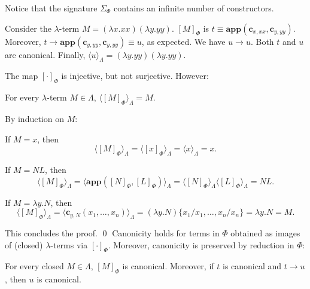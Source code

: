 \documentclass{LMCS}
\newcommand{\varone}{x}
\newcommand{\vartwo}{y}
\newcommand{\lambdaone}{M}
\newcommand{\lambdatwo}{N}
\newcommand{\lambdathree}{L}
\newcommand{\termone}{t}
\newcommand{\termtwo}{u}
\newcommand{\appTRS}{\mathbf{app}}
\newcommand{\constr}[2]{\mathbf{c}_{#1,#2}}
\newcommand{\LambdatoTRS}[1]{[#1]_{\Phi}}
\newcommand{\TRStolambda}[1]{\langle{#1}\rangle_{\Lambdaterms}}
\newcommand{\Lambdaterms}{\Lambda}
\newcommand{\Functions}[1]{\Sigma_{#1}}
\newcommand{\TRS}{\Phi}
\newcommand{\rewrTRS}{\rightarrow}
\newenvironment{varitemize}
{
\begin{list}{\labelitemi}
{\setlength{\itemsep}{0.0mm}
 \setlength{\topsep}{0.0mm}
 \setlength{\parindent}{0.0mm}
 \setlength{\parskip}{0.0mm}
 \setlength{\parsep}{0.0mm}
 \setlength{\partopsep}{0.0mm}
 \setlength{\leftmargin}{15pt}
 \setlength{\labelsep}{5pt}
 \setlength{\labelwidth}{10pt}}}
{
 \end{list} 
}
\newcounter{number}
\begin{document}
\noindent Notice that the signature $\Functions{\TRS}$ contains an
infinite number of constructors.
\begin{exa}
Consider the $\lambda$-term $\lambdaone=(\lambda \varone.\varone\varone)(\lambda \vartwo.\vartwo\vartwo)$.
$\LambdatoTRS{\lambdaone}$ is
$\termone\equiv\appTRS(\constr{\varone}{\varone\varone},\constr{\vartwo}{\vartwo\vartwo})$.
Moreover, $\termone\rewrTRS\appTRS(\constr{\vartwo}{\vartwo\vartwo},\constr{\vartwo}{\vartwo\vartwo})\equiv\termtwo$, 
as expected. We have $\termtwo\rewrTRS\termtwo$. Both $\termone$ and $\termtwo$ are
canonical. Finally, $\TRStolambda{\termtwo}=(\lambda\vartwo.\vartwo\vartwo)(\lambda\vartwo.\vartwo\vartwo)$.
\end{exa}
The map $\LambdatoTRS{\cdot}$ is injective, but not surjective. However:
\begin{lem}\label{lemma:invert}
For every $\lambda$-term $\lambdaone\in\Lambdaterms$, $\TRStolambda{\LambdatoTRS{\lambdaone}}=\lambdaone$.
\end{lem}
\proof
By induction on $\lambdaone$:
\begin{varitemize}
\item
  If $\lambdaone=\varone$, then 
  $$
    \TRStolambda{\LambdatoTRS{\lambdaone}}=\TRStolambda{\LambdatoTRS{\varone}}=\TRStolambda{\varone}=\varone.
  $$
\item
  If $\lambdaone=\lambdatwo\lambdathree$, then
  $$
  \TRStolambda{\LambdatoTRS{\lambdaone}}=
  \TRStolambda{\appTRS(\LambdatoTRS{\lambdatwo},\LambdatoTRS{\lambdathree})}=
  \TRStolambda{\LambdatoTRS{\lambdatwo}}\TRStolambda{\LambdatoTRS{\lambdathree}}=
  \lambdatwo\lambdathree.
  $$
\item
  If $\lambdaone=\lambda\vartwo.\lambdatwo$, then
  $$
    \TRStolambda{\LambdatoTRS{\lambdaone}}=
    \TRStolambda{\constr{\vartwo}{\lambdatwo}(\varone_{1},\ldots,\varone_{n})}=
    (\lambda\vartwo.\lambdatwo)\{\varone_1/\varone_1,\ldots,\varone_n/\varone_n\}=
    \lambda\vartwo.\lambdatwo=\lambdaone.
  $$
\end{varitemize}
This concludes the proof.
\qed
Canonicity holds for terms in $\TRS$ obtained as images of (closed) 
$\lambda$-terms via $\LambdatoTRS{\cdot}$. Moreover, canonicity
is preserved by reduction in $\TRS$:
\begin{lem}\label{lemma:canonicity}
For every closed $\lambdaone\in\Lambdaterms$, $\LambdatoTRS{\lambdaone}$ is canonical.
Moreover, if $\termone$ is canonical and $\termone\rewrTRS\termtwo$, 
then $\termtwo$ is canonical. 
\end{lem}
\proof
\end{document}
